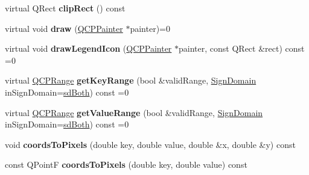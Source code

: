 \begin{DoxyCompactItemize}
\item 
\hypertarget{classQCPAbstractPlottable_ac01960b0827913922f5364d559c124ed}{virtual Q\-Rect {\bfseries clip\-Rect} () const }\label{classQCPAbstractPlottable_ac01960b0827913922f5364d559c124ed}

\item 
\hypertarget{classQCPAbstractPlottable_aae10c24c7ed9d9364f0a5a4d9a5e5aec}{virtual void {\bfseries draw} (\hyperlink{classQCPPainter}{Q\-C\-P\-Painter} $\ast$painter)=0}\label{classQCPAbstractPlottable_aae10c24c7ed9d9364f0a5a4d9a5e5aec}

\item 
\hypertarget{classQCPAbstractPlottable_ab28af4bd3965813be4223d8092aed38b}{virtual void {\bfseries draw\-Legend\-Icon} (\hyperlink{classQCPPainter}{Q\-C\-P\-Painter} $\ast$painter, const Q\-Rect \&rect) const =0}\label{classQCPAbstractPlottable_ab28af4bd3965813be4223d8092aed38b}

\item 
\hypertarget{classQCPAbstractPlottable_a7aa24ed0b3c39bd99338c7b9f145a71b}{virtual \hyperlink{classQCPRange}{Q\-C\-P\-Range} {\bfseries get\-Key\-Range} (bool \&valid\-Range, \hyperlink{classQCPAbstractPlottable_a661743478a1d3c09d28ec2711d7653d8}{Sign\-Domain} in\-Sign\-Domain=\hyperlink{classQCPAbstractPlottable_a661743478a1d3c09d28ec2711d7653d8a082b98cfb91a7363a3b5cd17b0c1cd60}{sd\-Both}) const =0}\label{classQCPAbstractPlottable_a7aa24ed0b3c39bd99338c7b9f145a71b}

\item 
\hypertarget{classQCPAbstractPlottable_aed35cfebe5546feea7af2638dd869d5f}{virtual \hyperlink{classQCPRange}{Q\-C\-P\-Range} {\bfseries get\-Value\-Range} (bool \&valid\-Range, \hyperlink{classQCPAbstractPlottable_a661743478a1d3c09d28ec2711d7653d8}{Sign\-Domain} in\-Sign\-Domain=\hyperlink{classQCPAbstractPlottable_a661743478a1d3c09d28ec2711d7653d8a082b98cfb91a7363a3b5cd17b0c1cd60}{sd\-Both}) const =0}\label{classQCPAbstractPlottable_aed35cfebe5546feea7af2638dd869d5f}

\item 
\hypertarget{classQCPAbstractPlottable_ade710a776104b14c1c835168ce1bfc5c}{void {\bfseries coords\-To\-Pixels} (double key, double value, double \&x, double \&y) const }\label{classQCPAbstractPlottable_ade710a776104b14c1c835168ce1bfc5c}

\item 
\hypertarget{classQCPAbstractPlottable_a9fd1c9df8391781f05b0be22fbe91e13}{const Q\-Point\-F {\bfseries coords\-To\-Pixels} (double key, double value) const }\label{classQCPAbstractPlottable_a9fd1c9df8391781f05b0be22fbe91e13}


\end{DoxyCompactItemize}
